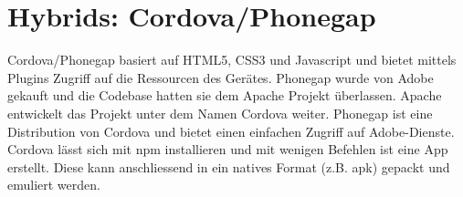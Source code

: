 \section{Hybrids: Cordova/Phonegap}

Cordova/Phonegap basiert auf HTML5, CSS3 und Javascript und bietet mittels Plugins Zugriff auf die Ressourcen des Gerätes. Phonegap wurde von Adobe gekauft und die Codebase hatten sie dem Apache Projekt überlassen. Apache entwickelt das Projekt unter dem Namen Cordova weiter. Phonegap ist eine Distribution von Cordova und bietet einen einfachen Zugriff auf Adobe-Dienste. Cordova lässt sich mit npm installieren und mit wenigen Befehlen ist eine App erstellt. Diese kann anschliessend in ein natives Format (z.B. apk) gepackt und emuliert werden.